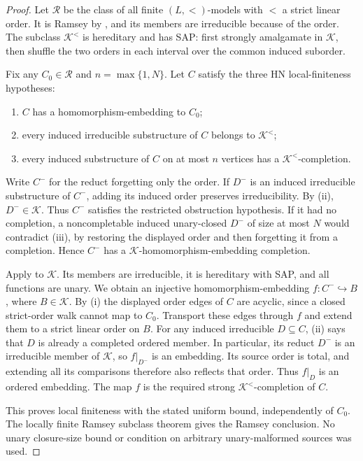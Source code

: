 \begin{proof}
Let $\mathcal R$ be the class of all finite $(L,<)$-models with $<$ a
strict linear order. It is Ramsey by \cite[Theorem~2.19]{HN-Ramsey}, and
its members are irreducible because of the order. The subclass
$\mathcal K^<$ is hereditary and has SAP: first strongly amalgamate in
$\mathcal K$, then shuffle the two orders in each interval over the
common induced suborder.

Fix any $C_0\in\mathcal R$ and $n=\max\{1,N\}$. Let $C$ satisfy the
three HN local-finiteness hypotheses:
\begin{enumerate}[label=(\roman*)]
\item $C$ has a homomorphism-embedding to $C_0$;
\item every induced irreducible substructure of $C$ belongs to
      $\mathcal K^<$;
\item every induced substructure of $C$ on at most $n$ vertices has a
      $\mathcal K^<$-completion.
\end{enumerate}
Write $C^-$ for the reduct forgetting only the order. If $D^-$ is an
induced irreducible substructure of $C^-$, adding its induced order
preserves irreducibility. By (ii), $D^-\in\mathcal K$.
Thus $C^-$ satisfies the restricted obstruction hypothesis. If it had no
completion, a noncompletable induced unary-closed $D^-$ of size at most
$N$ would contradict (iii), by restoring the displayed order and then
forgetting it from a completion. Hence $C^-$ has a
$\mathcal K$-homomorphism-embedding completion.

Apply \cite[Proposition~2.6]{HN-Ramsey} to $\mathcal K$. Its members are
irreducible, it is hereditary with SAP, and all functions are unary.
We obtain an injective homomorphism-embedding $f:C^-\hookrightarrow B$,
where $B\in\mathcal K$. By (i) the displayed order edges of $C$ are
acyclic, since a closed strict-order walk cannot map to $C_0$. Transport
these edges through $f$ and extend them to a strict linear order on $B$.
For any induced irreducible $D\subseteq C$, (ii) says that $D$ is already
a completed ordered member. In particular, its reduct $D^-$ is an
irreducible member of $\mathcal K$, so $f|_{D^-}$ is an embedding.
Its source order is total, and extending all its comparisons therefore
also reflects that order. Thus $f|_D$ is an ordered embedding. The map
$f$ is the required strong $\mathcal K^<$-completion of $C$.

This proves local finiteness with the stated uniform bound, independently
of $C_0$. The locally finite Ramsey subclass theorem
\cite[Theorem~2.11]{HN-Ramsey} gives the Ramsey conclusion. No unary
closure-size bound or condition on arbitrary unary-malformed sources was
used.
\end{proof}

